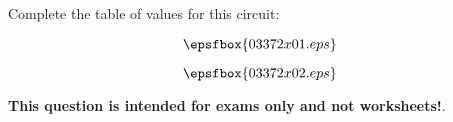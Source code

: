 

Complete the table of values for this circuit:

$$\epsfbox{03372x01.eps}$$







$$\epsfbox{03372x02.eps}$$







{\bf This question is intended for exams only and not worksheets!}.



